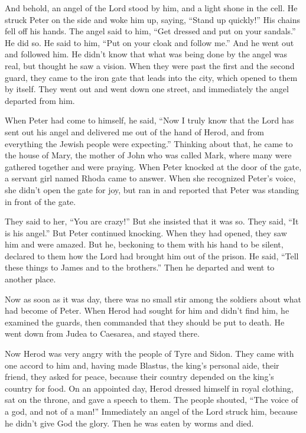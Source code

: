  And behold, an angel of the Lord stood by him, and a
light shone in the cell. He struck Peter on the side and woke him up,
saying, ``Stand up quickly!'' His chains fell off his hands.
 The angel said to him, ``Get dressed and put on your
sandals.'' He did so. He said to him, ``Put on your cloak and follow
me.''  And he went out and followed him. He didn't know
that what was being done by the angel was real, but thought he saw a
vision.  When they were past the first and the second
guard, they came to the iron gate that leads into the city, which opened
to them by itself. They went out and went down one street, and
immediately the angel departed from him.

 When Peter had come to himself, he said, ``Now I truly
know that the Lord has sent out his angel and delivered me out of the
hand of Herod, and from everything the Jewish people were expecting.''
 Thinking about that, he came to the house of Mary, the
mother of John who was called Mark, where many were gathered together
and were praying.  When Peter knocked at the door of the
gate, a servant girl named Rhoda came to answer.  When
she recognized Peter's voice, she didn't open the gate for joy, but ran
in and reported that Peter was standing in front of the gate.

 They said to her, ``You are crazy!'' But she insisted
that it was so. They said, ``It is his angel.''  But
Peter continued knocking. When they had opened, they saw him and were
amazed.  But he, beckoning to them with his hand to be
silent, declared to them how the Lord had brought him out of the prison.
He said, ``Tell these things to James and to the brothers.'' Then he
departed and went to another place.

 Now as soon as it was day, there was no small stir among
the soldiers about what had become of Peter.  When Herod
had sought for him and didn't find him, he examined the guards, then
commanded that they should be put to death. He went down from Judea to
Caesarea, and stayed there.

 Now Herod was very angry with the people of Tyre and
Sidon. They came with one accord to him and, having made Blastus, the
king's personal aide, their friend, they asked for peace, because their
country depended on the king's country for food.  On an
appointed day, Herod dressed himself in royal clothing, sat on the
throne, and gave a speech to them.  The people shouted,
``The voice of a god, and not of a man!''  Immediately an
angel of the Lord struck him, because he didn't give God the glory. Then
he was eaten by worms and died.


